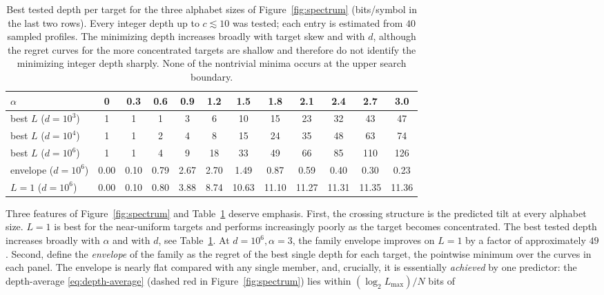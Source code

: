 \documentclass[11pt]{article}
\newcommand{\Nseq}{N}
\begin{document}
\begin{table}[htp]
  \centering
  \small
  \begin{tabular}{lccccccccccc}
    \toprule
    \(\alpha\) & 0 & 0.3 & 0.6 & 0.9 & 1.2 & 1.5 &
    1.8 & 2.1 & 2.4 & 2.7 & 3.0 \\
    \midrule
    best \(L\) (\(d=10^3\))
      & 1 & 1 & 1 & 3 & 6 & 10 & 15 & 23 & 32 & 43 & 47 \\
    best \(L\) (\(d=10^4\))
      & 1 & 1 & 2 & 4 & 8 & 15 & 24 & 35 & 48 & 63 & 74 \\
    best \(L\) (\(d=10^6\))
      & 1 & 1 & 4 & 9 & 18 & 33 & 49 & 66 & 85 & 110 & 126 \\
    \midrule
    envelope (\(d=10^6\))
      & 0.00 & 0.10 & 0.79 & 2.67 & 2.70 & 1.49 &
        0.87 & 0.59 & 0.40 & 0.30 & 0.23 \\
    \(L{=}1\) (\(d=10^6\))
      & 0.00 & 0.10 & 0.80 & 3.88 & 8.74 & 10.63 &
        11.10 & 11.27 & 11.31 & 11.35 & 11.36 \\
    \bottomrule
  \end{tabular}
  \caption{Best tested depth per target for the three alphabet sizes of
  Figure~\ref{fig:spectrum} (bits/symbol in the last two rows).  Every integer depth up to \(c\lesssim10\) was tested; each entry is
  estimated from \(40\) sampled profiles.  The minimizing
  depth increases broadly with target skew and with \(d\), although the
  regret curves for the more concentrated targets are shallow and therefore
  do not identify the minimizing integer depth sharply.  None of the
  nontrivial minima occurs at the upper search boundary.  }
  \label{tab:spectrum}
\end{table}
Three features of Figure~\ref{fig:spectrum} and Table~\ref{tab:spectrum}
deserve emphasis.
First, the crossing structure is the predicted tilt at every alphabet size.
\(L=1\) is best for the near-uniform targets and performs increasingly
poorly as the target becomes concentrated.  The best tested depth increases
broadly with \(\alpha\) and with \(d\), see Table~\ref{tab:spectrum}.
At \(d=10^6,\alpha=3\), the family envelope improves on
\(L=1\) by a factor of approximately \(49\).
Second, define the \emph{envelope} of the family as the regret of the best
single depth for each target, the pointwise minimum over the curves in
each panel.  The envelope is nearly flat compared with any single member,
and, crucially, it is essentially \emph{achieved} by one predictor: the
depth-average \eqref{eq:depth-average} (dashed red in
Figure~\ref{fig:spectrum}) lies within \((\log_2 L_{\max})/\Nseq\) bits of
\end{document}
